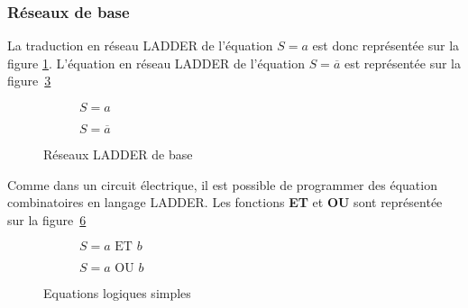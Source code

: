 

\subsubsection{Réseaux de base}

La traduction en réseau LADDER de l'équation $S = a$ est donc représentée sur la figure \ref{fig:ladAtoS}. L'équation en réseau LADDER de l'équation $S = \overline{a}$ est représentée sur la figure~\ref{fig:ladABartoS}

\begin{figure}[ht]
  \begin{subfigure}[b]{.49\textwidth}
  \centering
    
    \caption{$S = a$}
    \label{fig:ladAtoS}
  \end{subfigure}
  \begin{subfigure}[b]{.49\textwidth}
  \centering
    
    \caption{$S = \overline{a}$}
    \label{fig:ladABartoS}
  \end{subfigure}

  \caption{Réseaux LADDER de base}
\end{figure}

Comme dans un circuit électrique, il est possible de programmer des équation combinatoires en langage LADDER. Les fonctions \textbf{ET} et \textbf{OU} sont représentée sur la figure~\ref{fig:equaLogiques}

\begin{figure}[ht]
  \begin{subfigure}[b]{.49\textwidth}
    \centering
    
    \caption{$S = a \text{ ET } b$}
    \label{fig:aETb}
  \end{subfigure}
  \begin{subfigure}[b]{.49\textwidth}
    \centering 
    
    \caption{$S = a \text{ OU } b$}
    \label{fig:aOUb}
  \end{subfigure}
  \caption{Equations logiques simples}
  \label{fig:equaLogiques}
\end{figure}


